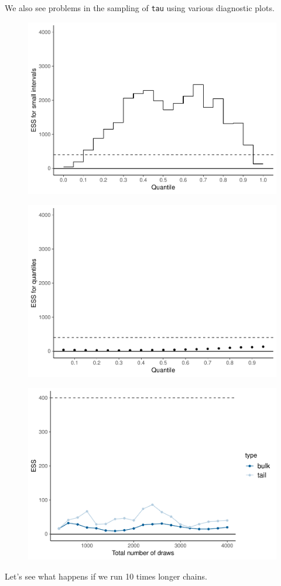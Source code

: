 \documentclass[american,]{article}
\begin{document}
We also see problems in the sampling of \texttt{tau} using various
diagnostic plots.

\begin{figure}[t]
  \centering
  \includegraphics[width=0.6\linewidth]{graphics/local-ess-jags-cp-tau-1.pdf}
\end{figure}

\begin{figure}[t]
  \centering
  \includegraphics[width=0.6\linewidth]{graphics/quantile-ess-jags-cp-tau-1.pdf}
\end{figure}

\begin{figure}[t]
  \centering
  \includegraphics[width=0.6\linewidth]{graphics/change-ess-jags-cp-tau-1.pdf}
\end{figure}

Let's see what happens if we run 10 times longer chains.
\end{document}

